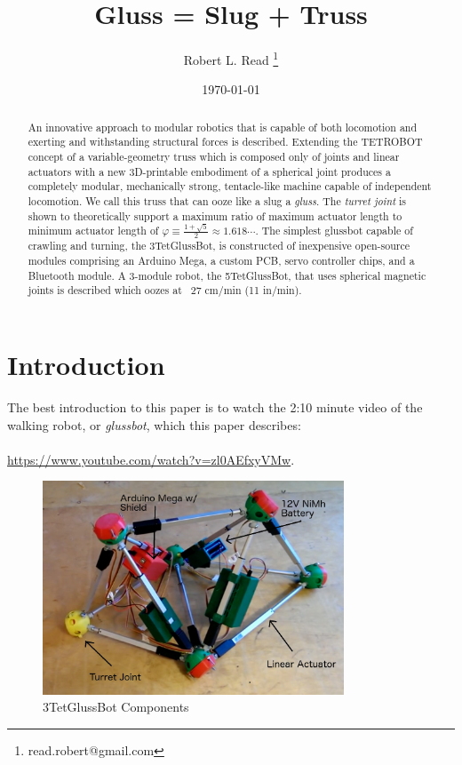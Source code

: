 \documentclass[11pt]{article}
\title{Gluss = Slug + Truss}
\author{Robert L. Read
  \thanks{read.robert@gmail.com}
}
\affil{Founder, Public Invention, an educational non-profit.}
\date{\today}
\begin{document}
\maketitle


\begin{abstract}
  An innovative approach to modular robotics that is capable of both locomotion and exerting and withstanding structural forces is described.
  Extending the TETROBOT\cite{sanderson1996modular,lee2002dynamic,lee1999dynamics} concept of a variable-geometry
  truss which is composed only of joints and linear actuators
  with a new 3D-printable embodiment of a
  spherical joint\cite{song2003spherical}
  produces a completely modular, mechanically strong, tentacle-like machine capable of independent locomotion.
  We call this truss that can ooze like a slug a \emph{gluss}.
  The \emph{turret joint} is shown to theoretically support a maximum ratio of maximum actuator length to
  minimum actuator length of  $\varphi \equiv \frac{1 + \sqrt{5}}{2} \approx 1.618 \cdots$.
  The simplest glussbot capable of crawling and turning, the 3TetGlussBot, is constructed of
  inexpensive open-source modules comprising an Arduino Mega, a custom PCB, servo controller chips, and a Bluetooth module.
  A 3-module robot, the 5TetGlussBot, that uses spherical magnetic joints is described which oozes at ~27 cm/min (11 in/min).
\end{abstract}

\section{Introduction}

The best introduction to this paper is to watch the 2:10 minute video of the
walking robot, or \emph{glussbot}, which this paper describes:\\
\\
\indent \url{https://www.youtube.com/watch?v=zl0AEfxyVMw}.\\

\begin{figure}[!ht]
  \centering
    \includegraphics[width=0.8\textwidth]{figureslowres/3TetGlussBotPhotoAnnotated.jpg}
    \caption[3TetGlussBot Components]{3TetGlussBot Components}
      \label{annotated}
\end{figure}
\end{document}
